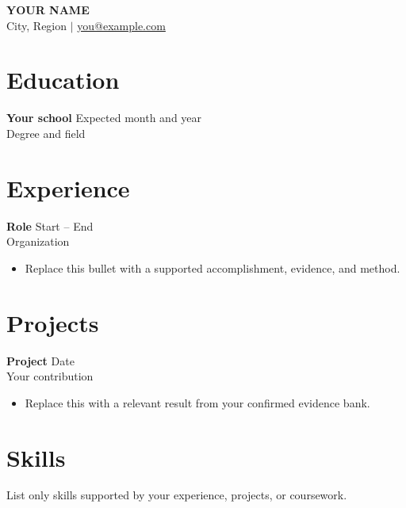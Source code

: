 \documentclass[letterpaper,10pt]{article}
\newcommand{\resumeItem}[1]{\item #1}
\newcommand{\entry}[3]{\textbf{#1} \hfill #3\\#2\par}
\begin{document}
{\LARGE\textbf{YOUR NAME}}\\
City, Region $|$ \href{mailto:you@example.com}{you@example.com}
\section*{Education}
\entry{Your school}{Degree and field}{Expected month and year}
\section*{Experience}
\entry{Role}{Organization}{Start -- End}
\begin{itemize}
  \resumeItem{Replace this bullet with a supported accomplishment, evidence, and method.}
\end{itemize}
\section*{Projects}
\entry{Project}{Your contribution}{Date}
\begin{itemize}
  \resumeItem{Replace this with a relevant result from your confirmed evidence bank.}
\end{itemize}
\section*{Skills}
List only skills supported by your experience, projects, or coursework.
\end{document}
